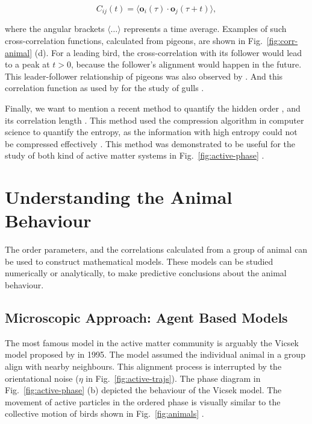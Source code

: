 \documentclass[11pt,twoside]{report}
\begin{document}
\begin{equation}
	C_{ij}(t) = \langle
		\mathbf{o}_{i}(\tau) \cdot \mathbf{o}_{j}(\tau + t)
	\rangle,
\end{equation}

\noindent where the angular brackets $\langle \dots \rangle$ represents a time average. Examples of such cross-correlation functions, calculated from pigeons, are shown in Fig.~\ref{fig:corr-animal} (d). For a leading bird, the cross-correlation with its follower would lead to a peak at $t > 0$, because the follower's alignment would happen in the future. This leader-follower relationship of pigeons was also observed by \citeauthor{chen2015epj} \cite{chen2015epj}. And this correlation function as used by \citeauthor{yomosa2013} for the study of gulls \cite{yomosa2013}.

Finally, we want to mention a recent method to quantify the hidden order \cite{martiniani2019prx}, and its correlation length \cite{martiniani2020}. This method used the compression algorithm in computer science to quantify the entropy, as the information with high entropy could not be compressed effectively \cite{mcanlis2016}. This method was demonstrated to be useful for the study of both kind of active matter systems in Fig.~\ref{fig:active-phase} \cite{martiniani2019prx, cavagna2020}.


\section{Understanding the Animal Behaviour}
\label{section:intro-model-theory}

The order parameters, and the correlations calculated from a group of animal can be used to construct mathematical models. These models can be studied numerically or analytically, to make predictive conclusions about the animal behaviour.


\subsection{Microscopic Approach: Agent Based Models}

The most famous model in the active matter community is arguably the Vicsek model proposed by \citeauthor{vicsek1995} in 1995. The model assumed the individual animal in a group align with nearby neighbours. This alignment process is interrupted by the orientational noise ($\eta$ in Fig.~\ref{fig:active-trajs}).
The phase diagram in Fig.~\ref{fig:active-phase} (b) depicted the behaviour of the Vicsek model. The movement of active particles in the ordered phase is visually similar to the collective motion of birds shown in Fig.~\ref{fig:animals} \cite{ballerini2008}.
\end{document}
